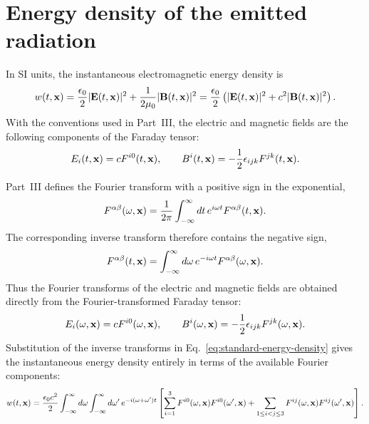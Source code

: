 \section{Energy density of the emitted radiation}

In SI units, the instantaneous electromagnetic energy density is
\begin{align}
  w(t,{\bf x})
  =\frac{\epsilon_0}{2}|{\bf E}(t,{\bf x})|^2
  +\frac{1}{2\mu_0}|{\bf B}(t,{\bf x})|^2
  =\frac{\epsilon_0}{2}
  \left(|{\bf E}(t,{\bf x})|^2+c^2|{\bf B}(t,{\bf x})|^2\right).
  \label{eq:standard-energy-density}
\end{align}
With the conventions used in Part~III, the electric and magnetic fields are
the following components of the Faraday tensor:
\begin{align}
  E_i(t,{\bf x})=cF^{i0}(t,{\bf x}),\qquad
  B^i(t,{\bf x})=-\frac12\epsilon_{ijk}F^{jk}(t,{\bf x}).
  \label{eq:fields-from-Faraday}
\end{align}

Part~III defines the Fourier transform with a positive sign in the
exponential,
\begin{align}
  F^{\alpha\beta}(\omega,{\bf x})
  =\frac1{2\pi}\int_{-\infty}^{\infty}dt\,
  e^{i\omega t}F^{\alpha\beta}(t,{\bf x}).
  \label{eq:Faraday-Fourier-convention-observables}
\end{align}
The corresponding inverse transform therefore contains the negative sign,
\begin{align}
  F^{\alpha\beta}(t,{\bf x})
  =\int_{-\infty}^{\infty}d\omega\,
  e^{-i\omega t}F^{\alpha\beta}(\omega,{\bf x}).
  \label{eq:Faraday-inverse-Fourier-observables}
\end{align}
Thus the Fourier transforms of the electric and magnetic fields are obtained
directly from the Fourier-transformed Faraday tensor:
\begin{align}
  E_i(\omega,{\bf x})=cF^{i0}(\omega,{\bf x}),\qquad
  B^i(\omega,{\bf x})=-\frac12\epsilon_{ijk}F^{jk}(\omega,{\bf x}).
  \label{eq:Fourier-fields-from-Faraday}
\end{align}
Substitution of the inverse transforms in
Eq.~\eqref{eq:standard-energy-density} gives the instantaneous energy density
entirely in terms of the available Fourier components:
\begin{align}
  w(t,{\bf x})
  =\frac{\epsilon_0c^2}{2}
  \int_{-\infty}^{\infty}d\omega
  \int_{-\infty}^{\infty}d\omega'\,
  e^{-i(\omega+\omega')t}
  \left[
    \sum_{i=1}^{3}F^{i0}(\omega,{\bf x})F^{i0}(\omega',{\bf x})
    +\sum_{1\leq i<j\leq3}F^{ij}(\omega,{\bf x})F^{ij}(\omega',{\bf x})
  \right].
  \label{eq:instantaneous-energy-density-Fourier-F}
\end{align}

